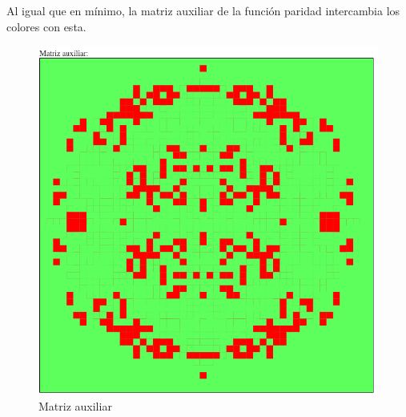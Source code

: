 	Al igual que en mínimo, la matriz auxiliar de la función paridad intercambia los colores con esta.
	\begin{figure}[H]
		\begin{center}
			\includegraphics[scale=.3]{GOLM/img/regla3634-3-1.png}
			\caption{Matriz auxiliar}
			\label{fig:golm14}
		\end{center}
	\end{figure}




